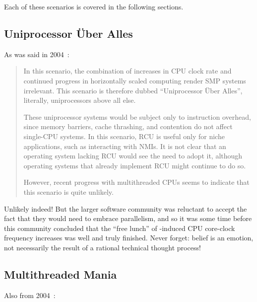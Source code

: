 Each of these scenarios is covered in the following sections.

\subsection{Uniprocessor \"Uber Alles}
\label{sec:future:Uniprocessor \"Uber Alles}

As was said in 2004~\cite{PaulEdwardMcKenneyPhD}:

\begin{quote}
	In this scenario, the combination of 
	increases in CPU
	clock rate and continued progress in horizontally scaled computing
	render SMP systems irrelevant.
	This scenario is therefore dubbed ``Uniprocessor \"Uber
	Alles'', literally, uniprocessors above all else.

	These uniprocessor systems would be subject only to instruction
	overhead, since memory barriers, cache thrashing, and contention
	do not affect single-CPU systems.
	In this scenario, RCU is useful only for niche applications, such
	as interacting with NMIs.
	It is not clear that an operating system lacking RCU would see
	the need to adopt it, although operating
	systems that already implement RCU might continue to do so.

	However, recent progress with multithreaded CPUs seems to indicate
	that this scenario is quite unlikely.
\end{quote}

Unlikely indeed!
But the larger software community was reluctant to accept the fact that
they would need to embrace parallelism, and so it was some time before
this community concluded that the ``free lunch'' of
-induced
CPU core-clock frequency increases was well and truly finished.
Never forget: belief is an emotion, not necessarily the result of a
rational technical thought process!

\subsection{Multithreaded Mania}
\label{sec:future:Multithreaded Mania}

Also from 2004~\cite{PaulEdwardMcKenneyPhD}:

